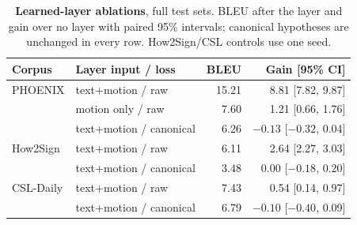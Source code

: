 \begin{table}[t]\centering\footnotesize\setlength{\tabcolsep}{3.5pt}
\caption{\textbf{Learned-layer ablations}, full test sets. BLEU after the layer and gain over no layer with paired 95\% intervals; canonical hypotheses are unchanged in every row. How2Sign/CSL controls use one seed.}\label{tab:layers}
\begin{tabular}{@{}llrr@{}}\toprule
Corpus&Layer input / loss&BLEU&Gain [95\% CI]\\\midrule
PHOENIX&text+motion / raw&15.21&8.81 [7.82, 9.87]\\
&motion only / raw&7.60&1.21 [0.66, 1.76]\\
&text+motion / canonical&6.26&$-0.13$ [$-0.32$, 0.04]\\
How2Sign&text+motion / raw&6.11&2.64 [2.27, 3.03]\\
&text+motion / canonical&3.48&0.00 [$-0.18$, 0.20]\\
CSL-Daily&text+motion / raw&7.43&0.54 [0.14, 0.97]\\
&text+motion / canonical&6.79&$-0.10$ [$-0.40$, 0.09]\\
\bottomrule\end{tabular}\end{table}
